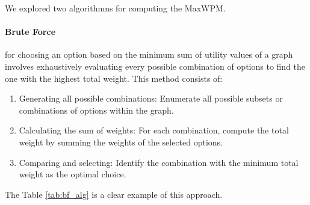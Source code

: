 We explored two algorithmns for computing the MaxWPM.

\paragraph{Brute Force} for choosing an option based on the minimum sum of utility values of a graph involves exhaustively evaluating every possible combination of options to find the one with the highest total weight. 
This method consists of:
\begin{enumerate}
  \item Generating all possible combinations: Enumerate all possible subsets or combinations of options within the graph.
  \item Calculating the sum of weights: For each combination, compute the total weight by summing the weights of the selected options.
  \item Comparing and selecting: Identify the combination with the minimum total weight as the optimal choice.
\end{enumerate}
The Table \ref{tab:bf_alg} is a clear example of this approach. \\   

